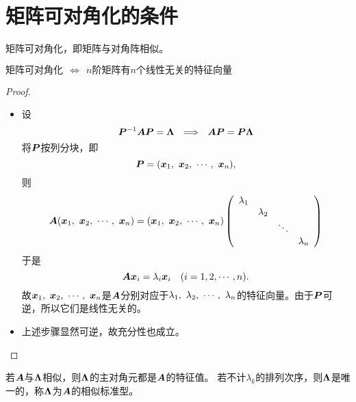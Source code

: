 \section{矩阵可对角化的条件}


矩阵可对角化，即矩阵与对角阵相似。    


\begin{dingli}
  $\mbox{矩阵可对角化} ~~\Longleftrightarrow~~
  \mbox{$n$阶矩阵有$n$个线性无关的特征向量}$ 
\end{dingli}
\begin{proof}
\begin{itemize}
\item[\blue{($\Rightarrow$)}] 设
  $$
  \boldsymbol{P}^{-1}\boldsymbol{A}\boldsymbol{P}=\boldsymbol{\Lambda}  ~~\Longrightarrow~~
  \boldsymbol{A}\boldsymbol{P}=\boldsymbol{P}\boldsymbol{\Lambda}
  $$
  将$\boldsymbol{P}$按列分块，即
  $$
  \boldsymbol{P}=({\boldsymbol{x}}_1,~{\boldsymbol{x}}_2,~\cdots,~{\boldsymbol{x}}_n),
  $$
  则
  $$
  \boldsymbol{A}({\boldsymbol{x}}_1,~{\boldsymbol{x}}_2,~\cdots,~{\boldsymbol{x}}_n)=({\boldsymbol{x}}_1,~{\boldsymbol{x}}_2,~\cdots,~{\boldsymbol{x}}_n)\left(
    \begin{array}{cccc}
      \lambda_1&&&\\
               &\lambda_2&&\\
               &&\ddots&\\
               &&&\lambda_n
    \end{array}
  \right)
  $$
  于是
  $$
  \boldsymbol{A}{\boldsymbol{x}}_i=\lambda_i{\boldsymbol{x}}_i\quad(i=1,2,\cdots,n).
  $$
  故${\boldsymbol{x}}_1,~{\boldsymbol{x}}_2,~\cdots,~{\boldsymbol{x}}_n$是$\boldsymbol{A}$分别对应于$\lambda_1,~\lambda_2,~\cdots,~\lambda_n$的特征向量。由于$\boldsymbol{P}$可逆，所以它们是线性无关的。
  \item[\blue{($\Leftarrow$)}] 上述步骤显然可逆，故充分性也成立。
\end{itemize}
\end{proof}






若$\boldsymbol{A}$与$\boldsymbol{\Lambda}$相似，则$\boldsymbol{\Lambda}$的主对角元都是$\boldsymbol{A}$的特征值。
若不计$\lambda_k$的排列次序，则$\boldsymbol{\Lambda}$是唯一的，称$\boldsymbol{\Lambda}$为$\boldsymbol{A}$的相似标准型。






